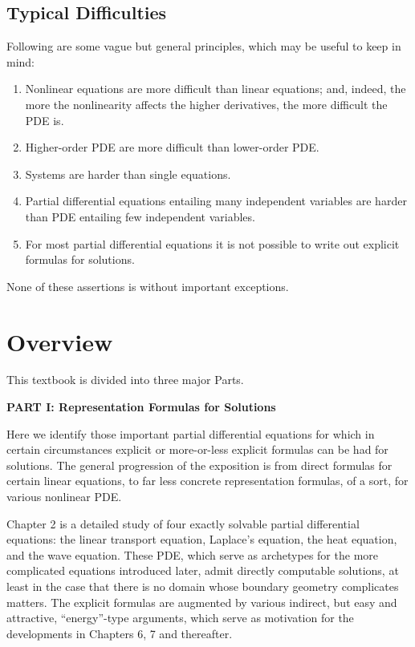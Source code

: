 \subsection{Typical Difficulties}
\label{sec:typical-difficulties}

Following are some vague but general principles, which may be useful to keep in mind:
\begin{enumerate}
\item Nonlinear equations are more difficult than linear equations; and, indeed, the more the nonlinearity affects the higher derivatives, the more difficult the PDE is.
\item Higher-order PDE are more difficult than lower-order PDE.
\item Systems are harder than single equations.
\item Partial differential equations entailing many independent variables are harder than PDE entailing few independent variables.
\item For most partial differential equations it is not possible to write out explicit formulas for solutions.
\end{enumerate}

None of these assertions is without important exceptions.

\section{Overview}
\label{sec:chapter1-overview}

This textbook is divided into three major Parts.

\textbf{PART I: Representation Formulas for Solutions}

Here we identify those important partial differential equations for which in certain circumstances explicit or more-or-less explicit formulas can be had for solutions. The general progression of the exposition is from direct formulas for certain linear equations, to far less concrete representation formulas, of a sort, for various nonlinear PDE.

Chapter 2 is a detailed study of four exactly solvable partial differential equations: the linear transport equation, Laplace's equation, the heat equation, and the wave equation. These PDE, which serve as archetypes for the more complicated equations introduced later, admit directly computable solutions, at least in the case that there is no domain whose boundary geometry complicates matters. The explicit formulas are augmented by various indirect, but easy and attractive, ``energy''-type arguments, which serve as motivation for the developments in Chapters 6, 7 and thereafter.

